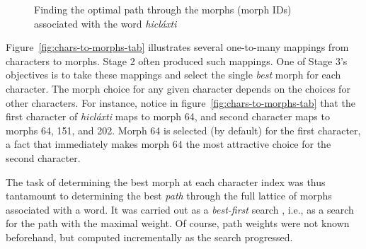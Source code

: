 {\begin{figure}[t]
\begin{mdframed}
\caption{Finding the optimal path through the morphs (morph IDs) associated with the word \textit{hicl\'{a}xti}}
\label{fig:best-paths}
\end{mdframed}
\end{figure}
Figure~\ref{fig:chars-to-morphs-tab} illustrates several one-to-many mappings from 
characters to morphs. Stage 2 often produced such mappings.
One of Stage 3's objectives is to take these mappings and select the single \emph{best} morph for each character.
 The morph choice for any given character depends on the choices 
for other characters. For instance, notice in figure~\ref{fig:chars-to-morphs-tab} that the first 
character of \textit{hicl\'{a}xti} maps to morph 64, and second character maps to 
morphs  64, 151, and 202. Morph 64 is selected (by default) for the first character, 
a fact that immediately makes morph 64 the most attractive choice for the second character.

The task of determining the best morph at each character index was thus tantamount to determining the 
best \emph{path} through the full lattice of morphs associated with a word.
It was carried out as a
\emph{best-first} search \citep{pearl:1984}, i.e., as a search for the 
path with the maximal weight. Of course, path weights were not known beforehand, 
but computed incrementally as the search progressed. 

}
